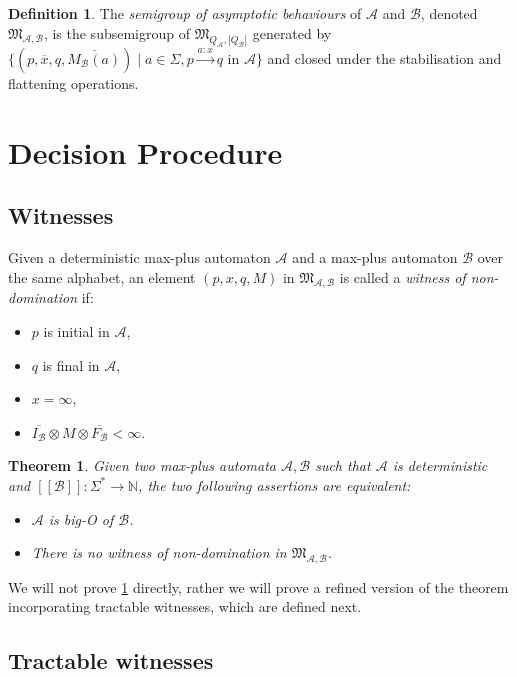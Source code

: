 \documentclass[10pt,a4paper]{amsart}
\newtheorem{thm}{Theorem}[section]
\theoremstyle{definition}
\newtheorem{defi}[defi]{Definition}
\numberwithin{equation}{section}
\theoremstyle{remark}
\newcommand{\N}{\mathbb{N}}
\newcommand{\ideal}{\mathfrak{M}}
\newcommand{\autA}{\mathcal{A}}
\newcommand{\autB}{\mathcal{B}}
\newcommand{\brfunc}[1]{[\![#1]\!]}
\newcommand{\funcB}{\brfunc{\autB}}
\theoremstyle{remark}
\begin{document}
\begin{defi}\label{def:sgab}
The \emph{semigroup of asymptotic behaviours} of $\autA$ and $\autB$, denoted $\ideal_{\autA,\autB}$, is the subsemigroup of $\ideal_{Q_\autA,|Q_\autB|}$ generated by $\{(p,\overline{x},q,\overline{M_\autB(a)}) \mid a\in \Sigma, p\xrightarrow{a:x}q \text{ in } \autA\}$ and closed under the stabilisation and flattening operations.
\end{defi}


\section{Decision Procedure}
\label{sec:decision}

\subsection{Witnesses}

Given a deterministic max-plus automaton $\autA$ and a max-plus automaton $\autB$ over the same alphabet, an element $(p,x,q,M)$ in $\ideal_{\autA,\autB}$ is called a \emph{witness of non-domination} if:
\begin{itemize}
\item $p$ is initial in $\autA$,
\item $q$ is final in $\autA$,
\item $x = \infty$,
\item $\overline{I_\autB} \otimes M \otimes \overline{F_\autB} < \infty$.
\end{itemize}

\begin{thm}\label{thm:2assertion}
Given two max-plus automata $\autA,\autB$ such that $\autA$ is deterministic and $\funcB:\Sigma^* \to \N$, the two following assertions are equivalent:
\begin{itemize}
\item $\autA$ is big-O of $\autB$.
\item There is no witness of non-domination in $\ideal_{\autA,\autB}$.
\end{itemize}
\end{thm}
We will not prove \cref{thm:2assertion} directly, rather we will prove a refined version of the theorem incorporating tractable witnesses, which are defined next.

\subsection{Tractable witnesses}
\end{document}
